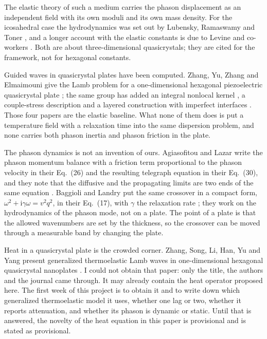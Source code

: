 \documentclass[11pt]{article}
\newcommand{\ii}{\mathrm{i}}
\begin{document}
The elastic theory of such a medium carries the phason displacement as an independent field with its own
moduli and its own mass density. For the icosahedral case the hydrodynamics was set out by Lubensky,
Ramaswamy and Toner \cite{Lubensky1985}, and a longer account with the elastic constants is due to Levine
and co-workers \cite{Levine1985}. Both are about three-dimensional quasicrystals; they are cited for the
framework, not for hexagonal constants.

Guided waves in quasicrystal plates have been computed. Zhang, Yu, Zhang and Elmaimouni give the Lamb
problem for a one-dimensional hexagonal piezoelectric quasicrystal plate \cite{Zhang2021}; the same group
has added an integral nonlocal kernel \cite{Wang2025}, a couple-stress description \cite{Wang2022} and a
layered construction with imperfect interfaces \cite{Wang2025b}. Those four papers are the elastic
baseline. What none of them does is put a temperature field with a relaxation time into the same
dispersion problem, and none carries both phason inertia and phason friction in the plate.

The phason dynamics is not an invention of ours. Agiasofitou and Lazar write the phason momentum balance
with a friction term proportional to the phason velocity in their Eq.~(26) and the resulting telegraph
equation in their Eq.~(30), and they note that the diffusive and the propagating limits are two ends of
the same equation \cite{Agiasofitou2014}. Baggioli and Landry put the same crossover in a compact form,
$\omega^2+\ii\gamma\omega=v^2q^2$, in their Eq.~(17), with $\gamma$ the relaxation rate
\cite{Baggioli2020}; they work on the hydrodynamics of the phason mode, not on a plate. The point of a
plate is that the allowed wavenumbers are set by the thickness, so the crossover can be moved through a
measurable band by changing the plate.

Heat in a quasicrystal plate is the crowded corner. Zhang, Song, Li, Han, Yu and Yang present
generalized thermoelastic Lamb waves in one-dimensional hexagonal quasicrystal nanoplates
\cite{Zhang2026}. I could not obtain that paper: only the title, the authors and the journal came through.
It may already contain the heat operator proposed here. The first week of this project is to obtain it and
to write down which generalized thermoelastic model it uses, whether one lag or two, whether it reports
attenuation, and whether its phason is dynamic or static. Until that is answered, the novelty of the heat
equation in this paper is provisional and is stated as provisional.
\end{document}
